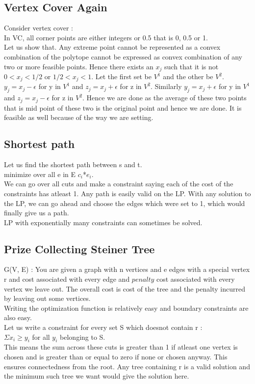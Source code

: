 \documentclass[solution,addpoints,12pt]{exam}
\begin{document}
\subsection{Vertex Cover Again}
Consider vertex cover :\\
In VC, all corner points are either integers or 0.5 that is 0, 0.5 or 1.\\
Let us show that.
Any extreme point cannot be represented
as a convex combination of the polytope cannot be expressed as convex
combination of any two or more feasible points.
Hence there exists an $x_j$ such that it is not $0 < x_j < 1/2$ or
$1/2 < x_j < 1$. Let the first set be $V^1$ and the other be $V^2$.\\
$y_j = x_j - \epsilon$ for y in $V^1$ and $z_j = x_j + \epsilon$
for z in $V^2$. Similarly $y_j = x_j + \epsilon$ for y in $V^1$ and
$z_j = x_j - \epsilon$ for z in $V^2$. Hence we are done as
the average of these two points that is mid point of these two is the
original point and hence we are done. It is feasible as well
because of the way we are setting.\\

\subsection{Shortest path}
Let us find the shortest path between s and t.\\
minimize over all e in E $c_i$*$e_i$.\\
We can go over all cuts and make a constraint saying each of the
cost of the constraints has atleast 1. Any path is easily valid on
the LP. With any solution to the LP, we can go ahead and choose
the edges which were set to 1, which would finally give us
a path.\\

LP with exponentially many constraints can sometimes be solved.\\

\subsection{Prize Collecting Steiner Tree}
G(V, E) : You are given a graph with n vertices and e edges with a special
vertex r and cost associated with every edge and $penalty$ cost associated
with every vertex we leave out. The overall cost is cost of the tree and
the penalty incurred by leaving out some vertices.\\
Writing the optimization function is relatively easy and boundary constraints
are also easy.\\
Let us write a constraint for every set S which doesnot contain r :\\
$\Sigma x_i \ge y_i$ for all $y_i$ belonging to S.\\
This means the sum across these cuts is greater than 1 if
atleast one vertex is chosen and is greater than or equal to zero if
none or chosen anyway. This ensures connectedness from the root. Any
tree containing r is a valid solution and the minimum such tree we want
would give the solution here.\\
\end{document}
